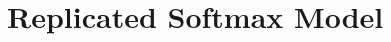 \documentclass[a4paper,12pt,oneside,onecolumn,final,fleqn]{config/UERJ/repUERJ}
\begin{document}

%

\mainmatter


%
%
%
%
%

\chapter{Replicated Softmax Model}%
\label{appen:rsm}%


%

%


\end{document}
